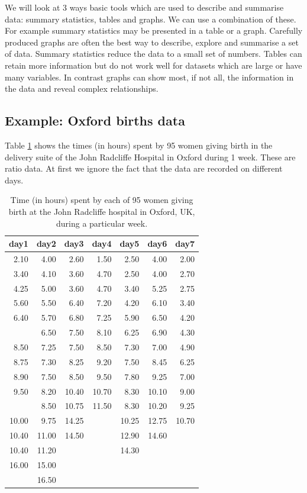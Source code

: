 \documentclass[
  british,
  11pt,
  openany, a4paper]{book}
\begin{document}
We will look at 3 ways basic tools which are used to describe and summarise data: summary statistics, tables and graphs. We can use a combination of these. For example summary statistics may be presented in a table or a graph. Carefully produced graphs are often the best way to describe, explore and summarise a set of data. Summary statistics reduce the data to a small set of numbers. Tables can retain more information but do not work well for datasets which are large or have many variables. In contrast graphs can show most, if not all, the information in the data and reveal complex relationships.

\subsection*{Example: Oxford births data}\label{example-oxford-births-data}

Table \ref{tab:taboxbirths} shows the times (in hours) spent by 95 women giving birth in the delivery suite of the John Radcliffe Hospital in Oxford during 1 week. These are ratio data. At first we ignore the fact that the data are recorded on different days.

\begin{table}

\caption{\label{tab:taboxbirths}Time (in hours) spent by each of 95 women giving birth at the John 
Radcliffe hospital in Oxford, UK, during a particular week.}
\centering
\begin{tabular}[t]{rrrrrrr}
\toprule
day1 & day2 & day3 & day4 & day5 & day6 & day7\\
\midrule
2.10 & 4.00 & 2.60 & 1.50 & 2.50 & 4.00 & 2.00\\
3.40 & 4.10 & 3.60 & 4.70 & 2.50 & 4.00 & 2.70\\
4.25 & 5.00 & 3.60 & 4.70 & 3.40 & 5.25 & 2.75\\
5.60 & 5.50 & 6.40 & 7.20 & 4.20 & 6.10 & 3.40\\
6.40 & 5.70 & 6.80 & 7.25 & 5.90 & 6.50 & 4.20\\
\addlinespace
7.30 & 6.50 & 7.50 & 8.10 & 6.25 & 6.90 & 4.30\\
8.50 & 7.25 & 7.50 & 8.50 & 7.30 & 7.00 & 4.90\\
8.75 & 7.30 & 8.25 & 9.20 & 7.50 & 8.45 & 6.25\\
8.90 & 7.50 & 8.50 & 9.50 & 7.80 & 9.25 & 7.00\\
9.50 & 8.20 & 10.40 & 10.70 & 8.30 & 10.10 & 9.00\\
\addlinespace
9.75 & 8.50 & 10.75 & 11.50 & 8.30 & 10.20 & 9.25\\
10.00 & 9.75 & 14.25 &  & 10.25 & 12.75 & 10.70\\
10.40 & 11.00 & 14.50 &  & 12.90 & 14.60 & \\
10.40 & 11.20 &  &  & 14.30 &  & \\
16.00 & 15.00 &  &  &  &  & \\
\addlinespace
19.00 & 16.50 &  &  &  &  & \\
\bottomrule
\end{tabular}
\end{table}
\end{document}
